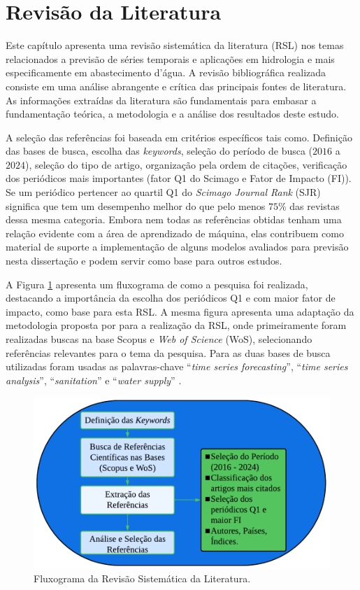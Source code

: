 \section{Revis\~ao da Literatura}\label{sec:refteo}

Este capítulo apresenta uma revisão sistemática  da literatura (RSL) nos temas relacionados a previsão de séries temporais e aplicações em hidrologia e mais especificamente em abastecimento d'água. A revisão bibliográfica realizada consiste em uma análise abrangente e crítica das principais fontes de literatura. As informações extraídas da literatura são fundamentais para embasar a fundamentação teórica, a metodologia e a análise dos resultados deste estudo.


A seleção das referências foi baseada em critérios específicos tais como. Definição das bases de busca, escolha das \textit{keywords}, seleção do período de busca ($2016$ a $2024$), seleção do tipo de artigo, organização pela ordem de citações, verificação dos periódicos mais importantes (fator Q1 do Scimago e Fator de Impacto (FI)). Se um periódico pertencer ao quartil Q1 do \textit{Scimago Journal Rank} (SJR) significa que tem um desempenho melhor do que pelo menos $75$\% das revistas dessa mesma categoria. Embora nem todas as referências obtidas tenham uma relação evidente com a área de aprendizado de máquina, elas contribuem como material de suporte a implementação de alguns modelos avaliados para previsão nesta dissertação e podem servir como base para outros estudos.

A Figura \ref{fig:serie-temporal} apresenta um fluxograma de como a pesquisa foi realizada, destacando a importância da escolha dos periódicos Q1 e com maior fator de impacto, como base para esta RSL. A mesma figura apresenta uma adaptação da metodologia proposta por  para a realização da RSL, onde primeiramente foram realizadas buscas na base Scopus e \textit{Web of Science} (WoS), selecionando referências relevantes para o tema da pesquisa. Para as duas bases de busca utilizadas foram usadas as palavras-chave ``\textit{time series forecasting}'', ``\textit{time series analysis}'', ``\textit{sanitation}'' e ``\textit{water supply}'' .

\begin{figure}[!htb]
	\centering
	\caption{Fluxograma da Revisão Sistemática da Literatura.}
	\label{fig:serie-temporal}
	\includegraphics[width=0.7\linewidth]{Revisao/Figuras/Figura2.pdf}
\end{figure}

